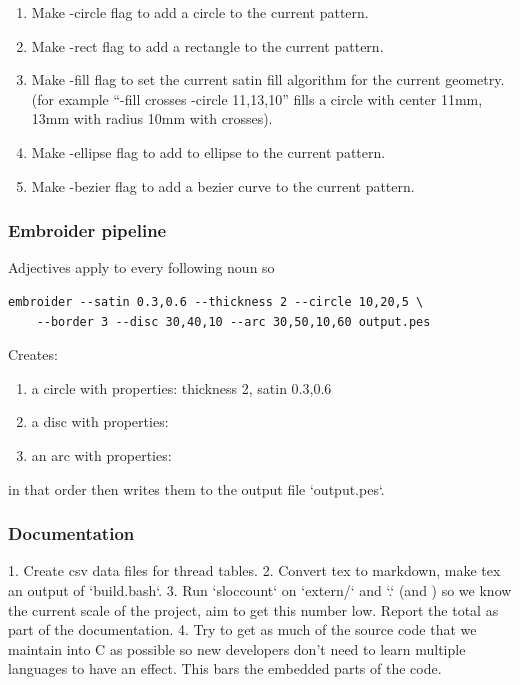 \documentclass[a4paper, 11pt]{report}
\begin{document}
\begin{enumerate}
\item Make -circle flag to add a circle to the current pattern.
\item Make -rect flag to add a rectangle to the current pattern.
\item Make -fill flag to set the current satin fill algorithm for the current geometry. (for example ``-fill crosses -circle 11,13,10'' fills a circle with center 11mm, 13mm with radius 10mm with crosses).
\item Make -ellipse flag to add to ellipse to the current pattern.
\item Make -bezier flag to add a bezier curve to the current pattern.
\end{enumerate}

\subsubsection{Embroider pipeline}

Adjectives apply to every following noun so

\begin{verbatim}
embroider --satin 0.3,0.6 --thickness 2 --circle 10,20,5 \
    --border 3 --disc 30,40,10 --arc 30,50,10,60 output.pes
\end{verbatim}

Creates:

\begin{enumerate}
\item a circle with properties: thickness 2, satin 0.3,0.6
\item a disc with properties: 
\item an arc with properties:
\end{enumerate}

in that order then writes them to the output file `output.pes`.

\subsubsection{Documentation}

1. Create csv data files for thread tables.
2. Convert tex to markdown, make tex an output of `build.bash`.
3. Run `sloccount` on `extern/` and `.` (and ) so we know the current scale
   of the project, aim to get this number low. Report the total as part of
   the documentation.
4. Try to get as much of the source code that we maintain into C as possible
   so new developers don't need to learn multiple languages to have an effect.
   This bars the embedded parts of the code. 
\end{document}

